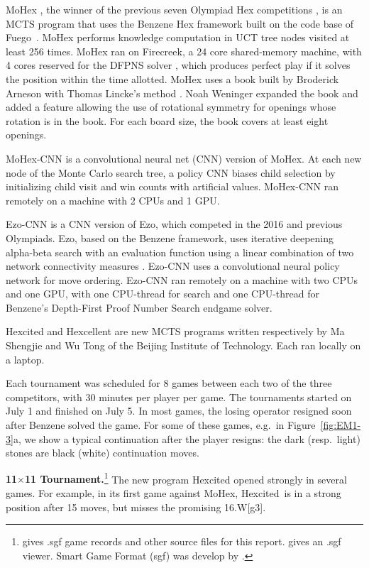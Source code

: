 \documentclass{icga}
\def\Eo{\mbox{\sc Ezo}}
\def\Ec{\mbox{\sc Ezo-CNN}}
\def\Hite{\mbox{\sc Hexcited}}
\def\Hent{\mbox{\sc Hexcellent}}
\def\Mx{\mbox{\sc MoHex}}
\def\Mc{\mbox{\sc MoHex-CNN}}
\def\Fuego{\mbox{\sc Fuego}}
\begin{document}
\Mx{} ,
the winner of the previous seven Olympiad Hex competitions ,
is an MCTS program that uses the Benzene Hex framework
built on the code base of \Fuego\ .
\Mx{} performs knowledge computation 
in UCT tree nodes visited at least 256 times.
\Mx{} ran on Firecreek, a 24 core shared-memory machine, 
with 4 cores reserved for the 
DFPNS solver , which
produces perfect play if it solves the
position within the time allotted.
\Mx{} uses a book built by Broderick Arneson with Thomas Lincke's method 
. 
Noah Weninger expanded the book and added a feature
allowing the use of rotational symmetry for openings
whose rotation is in the book.
For each board size, the book covers at least eight openings.

\Mc{} is a convolutional neural net (CNN) version of \Mx{}. 
At each new node of the Monte Carlo search tree, 
a policy CNN biases child selection by
initializing child visit and win counts with artificial values.
\Mc{} ran remotely on a machine with 2 CPUs and 1 GPU.

\Ec{} is a CNN version of \Eo{}, which competed
in the 2016 and previous Olympiads.
\Eo{}, based on the Benzene framework, 
uses iterative deepening alpha-beta search 
with an evaluation function using a linear combination of
two network connectivity measures .
\Ec{} uses a convolutional neural policy network
for move ordering.
\Ec{} ran remotely on a machine
with two CPUs and one GPU,
with one CPU-thread for search and one CPU-thread for
Benzene's Depth-First Proof Number Search endgame solver.

\Hite{} and \Hent{} are new MCTS programs written 
respectively by Ma Shengjie and Wu Tong
of the Beijing Institute of Technology.
Each ran locally on a laptop.

Each tournament was scheduled for 8 games between
each two of the three competitors, with 30 minutes per player per game.
The tournaments started on July 1 and finished on July 5.
In most games, the losing operator resigned
soon after Benzene solved the game.
For some of these games, 
e.g.\ in Figure~\ref{fig:EM1-3}a,
we show a typical continuation after the player resigns:
the dark (resp.\ light) stones are black (white) continuation moves.

{\large\bf 11$\times$11 Tournament.}\footnote{
  gives .sgf game records and other source files for this report.
   gives an .sgf viewer. Smart Game Format (sgf)
  was develop by .}
The new program \Hite{} opened strongly in several games.
For example, in its first game against \Mx, \Hite\ is in a strong
position after 15 moves, but misses the promising 16.W[g3].
\end{document}
